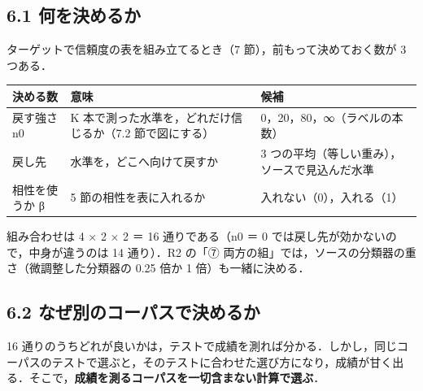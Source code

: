 \documentclass[a4paper,11pt]{ltjsarticle}
\begin{document}
\subsection*{6.1 何を決めるか}

ターゲットで信頼度の表を組み立てるとき（7 節），前もって決めておく数が 3 つある．

\begin{center}
\small
\begin{tabular}{>{\raggedright}p{4.3cm}>{\raggedright}p{7.4cm}p{3.3cm}}
\toprule
決める数 & 意味 & 候補 \\
\midrule
戻す強さ n0 & K 本で測った水準を，どれだけ信じるか（7.2 節で図にする） & 0，20，80，∞（ラベルの本数） \\
戻し先 & 水準を，どこへ向けて戻すか & 3 つの平均（等しい重み），ソースで見込んだ水準 \\
相性を使うか β & 5 節の相性を表に入れるか & 入れない（0），入れる（1） \\
\bottomrule
\end{tabular}
\end{center}
組み合わせは 4 × 2 × 2 ＝ 16 通りである（n0 ＝ 0 では戻し先が効かないので，中身が違うのは 14 通り）．R2 の「⑦ 両方の組」では，ソースの分類器の重さ（微調整した分類器の 0.25 倍か 1 倍）も一緒に決める．

\subsection*{6.2 なぜ別のコーパスで決めるか}

16 通りのうちどれが良いかは，テストで成績を測れば分かる．しかし，同じコーパスのテストで選ぶと，そのテストに合わせた選び方になり，成績が甘く出る．そこで，\textbf{成績を測るコーパスを一切含まない計算で選ぶ}．
\end{document}
